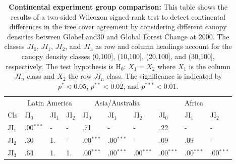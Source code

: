 			\begin{table}[ht]
				\centering
				\caption[Continental experiment group comparison]{\textbf{Continental experiment group comparison:} This table shows the results of a two-sided Wilcoxon signed-rank test to detect continental differences in the tree cover agreement by considering different canopy densities between GlobeLand30 and Global Forest Change at 2000. The classes $JI_0$, $JI_1$, $JI_2$, and $JI_3$ as row and column headings account for the canopy density classes (0,100], (10,100], (20,100], and (30,100], respectively. The test hypothesis is H$_0$: $X_1=X_2$ where $X_1$ is the column $JI_n$ class and $X_2$ the row $JI_n$ class. The significance is indicated by $p^{*}<0.05$, $p^{**}<0.02$, and $p^{***}<0.01$.}
				\label{tab:wilcoxontwosided_regions}
				\begin{tabular}{llllllllll}
					\hline
					& \multicolumn{3}{|c}{Latin America} & \multicolumn{3}{|c|}{Asia/Australia} & \multicolumn{3}{c|}{Africa} \\
					Cls & JI$_0$ & JI$_1$ & JI$_2$ & JI$_0$ & JI$_1$ & JI$_2$ & JI$_0$ & JI$_1$ & JI$_2$ \\\hline
					JI$_1$ & .00$^{***}$ & - & - & .71 & - & - & .22 & - & - \\
					JI$_2$ & .30 & 1. & - & .00$^{***}$ & .00$^{***}$ & - & .09 & .09  & - \\
					JI$_3$ & .64 & 1. & 1. & .00$^{***}$ & .00$^{***}$ & .00$^{***}$ & .00$^{***}$ & .00$^{***}$ & .00$^{***}$ \\\hline
				\end{tabular}
			\end{table}
